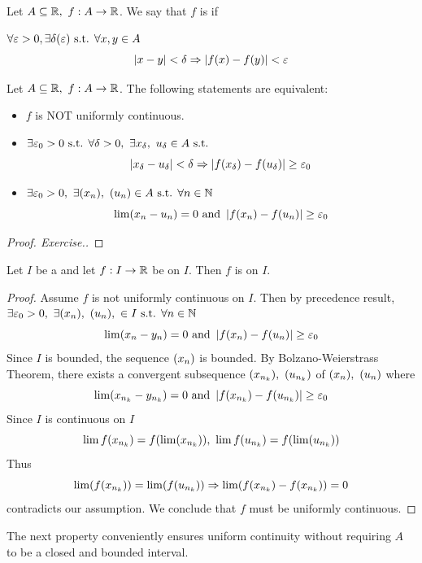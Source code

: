 \documentclass[a4paper,12pt]{article}
\begin{document}
\newpage
\begin{definition}
    Let \(A\subseteq\R,\ f:A\rightarrow\R\). We say that \(f\) is  if 
    
    \(\forall \varepsilon>0, \exists\delta(\varepsilon)\text{ s.t. }\forall x,y\in A\)
    \[\left\lvert x-y\right\rvert<\delta\Rightarrow\left\lvert f(x)-f(y)\right\rvert<\varepsilon\]
\end{definition}

\begin{theorem}
    Let \(A\subseteq\R,\ f:A\rightarrow\R\). The following statements are equivalent:
    \begin{itemize}
        \item \(f\) is NOT uniformly continuous.
        \item \(\exists \varepsilon_0>0\text{ s.t. }\forall \delta>0,\ \exists x_\delta,\ u_\delta\in A\text{ s.t. }\)
        \[\left\lvert x_\delta-u_\delta\right\rvert<\delta\Rightarrow\left\lvert f(x_\delta)-f(u_\delta)\right\rvert\ge \varepsilon_0\]
        \item \(\exists \varepsilon_0>0,\ \exists (x _{n }),\ (u _{n })\in A\text{ s.t. }\forall n\in \mathbb{N}\)
        \[\lim(x_n-u_n)=0\text{ and }\left\lvert f(x_n)-f(u_n)\right\rvert\ge\varepsilon_0\]
    \end{itemize}
    \begin{proof}[Proof. Exercise.]
        
    \end{proof}
\end{theorem}

\begin{theorem}
    Let \(I\) be a  and let \(f:I\rightarrow\mathbb{R}\) be  on \(I\). 
    Then \(f\) is  on \(I\).
    \begin{proof}
        Assume \(f\) is not uniformly continuous on \(I\). Then by precedence result, 
        \(\exists \varepsilon_0>0,\ \exists (x _{n }),\ (u _{n }),\ \in I\text{ s.t. }\forall n\in\mathbb{N}\)
        \[\lim(x_n-y_n)=0\text{ and }\left\lvert f(x_n)-f(u_n)\right\rvert\ge\varepsilon_0\]
        Since \(I\) is bounded, the sequence \((x_{n})\) is bounded. By Bolzano-Weierstrass Theorem, 
        there exists a convergent subsequence \((x _{n_k }),\ (u _{n_k })\) of \((x _{n }),\ (u _{n })\) where 
        \[\lim(x_{n_k}-y_{n_k})=0\text{ and }\left\lvert f(x _{n_k })-f(u _{n_k })\right\rvert\ge\varepsilon_0\]
        Since \(I\) is continuous on \(I\)
        \[\lim f\seq{x }{n_k }=f(\lim\seq{x}{n_k}),\ \lim f\seq{u }{n_k}=f(\lim\seq{u }{n_k})\]
        Thus \[\lim (f(x _{n_k}))=\lim (f(u_{n_k}))\Rightarrow \lim (f(x _{n_k })-f(x _{n_k }))=0\]
        contradicts our assumption.
        We conclude that \(f\) must be uniformly continuous.
    \end{proof}
\end{theorem}
\newpage
{} The next property conveniently ensures uniform continuity without requiring \(A\) to be a closed and bounded interval.\\
\end{document}
